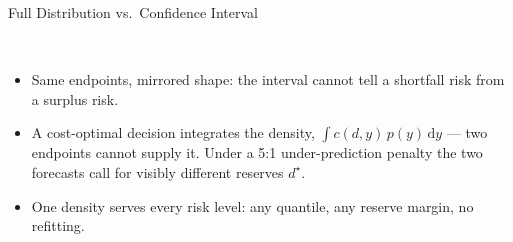 \documentclass[aspectratio=169]{beamer}
\newcommand{\cipanel}[5]{%
  \only<#1->{%
    \begin{scope}[shift={#2}]
      \fill[gray!12] (0.3786,0) rectangle (1.6214,1.5);
      \draw[gray!55,thick] (0.3786,0) -- (0.3786,1.5);
      \draw[gray!55,thick] (1.6214,0) -- (1.6214,1.5);
      \draw[|<->|,gray!65,thick] (0.3786,-0.32) -- (1.6214,-0.32);
      \draw[->,gray!60] (-0.2,0) -- (2.35,0);
      \draw[very thick,#3,line cap=round]
            plot[domain=0:2,samples=120,smooth] (\x,{#5});
      \node[#3,anchor=south,align=center,font=\small\bfseries] at (1,1.78) {#4};
    \end{scope}%
  }%
}
\newcommand{\decision}[3]{%
  \begin{scope}[shift={#1}]
    \draw[riskpurple,thick,dashed] ({#2},0) -- ({#2},1.52);
    \fill[riskpurple] ({#2},{#3}) circle (2.0pt);
    \node[riskpurple,anchor=south,font=\scriptsize\bfseries]
         at ({#2},1.53) {$d^\star$};
  \end{scope}%
}
\begin{document}
\begin{frame}{Full Distribution vs.\ Confidence Interval}
  \centering
  \vspace{0.2em}
  \\[0.2em]
  {\footnotesize\bfseries\color{nogablue}
   }

  \vspace{0.7em}
  \begin{itemize}[leftmargin=1.4em,itemsep=0.35em]
    \footnotesize
    \item<5-> Same endpoints, mirrored shape: the interval cannot tell a
              shortfall risk from a surplus risk.
    \item<6-> A cost-optimal decision integrates the density,
              $\int c(d,y)\,p(y)\,\mathrm{d}y$ --- two endpoints cannot supply it.
              Under a 5:1 under-prediction penalty the two forecasts call for
              visibly different reserves $d^\star$.
    \item<7-> One density serves every risk level: any quantile, any reserve
              margin, no refitting.
  \end{itemize}
\end{frame}
\end{document}

